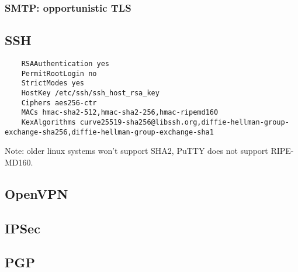 \subsubsection{SMTP: opportunistic TLS}



\subsection{SSH}


\begin{verbatim}
	RSAAuthentication yes
	PermitRootLogin no
	StrictModes yes
	HostKey /etc/ssh/ssh_host_rsa_key
	Ciphers aes256-ctr
	MACs hmac-sha2-512,hmac-sha2-256,hmac-ripemd160
	KexAlgorithms curve25519-sha256@libssh.org,diffie-hellman-group-exchange-sha256,diffie-hellman-group-exchange-sha1
\end{verbatim}

Note: older linux systems won't support SHA2, PuTTY does not support RIPE-MD160.

\subsection{OpenVPN}


\subsection{IPSec}

\subsection{PGP}




